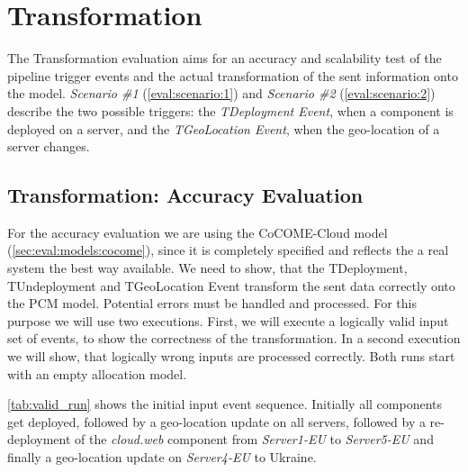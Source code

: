 \section{Transformation}
\label{sec:Evaluation:monitoring}

The Transformation evaluation aims for an accuracy and scalability test of the pipeline trigger events and the actual transformation of the sent information onto the model. \textit{Scenario \#1} (\autoref{eval:scenario:1}) and \textit{Scenario \#2} (\autoref{eval:scenario:2}) describe the two possible triggers: the \textit{TDeployment Event}, when a component is deployed on a server, and the \textit{TGeoLocation Event}, when the geo-location of a server changes. 

\subsection{Transformation: Accuracy Evaluation}

For the accuracy evaluation we are using the CoCOME-Cloud model (\autoref{sec:eval:models:cocome}), since it is completely specified and reflects the a real system the best way available. We need to show, that the TDeployment, TUndeployment and TGeoLocation Event transform the sent data correctly onto the PCM model. Potential errors must be handled and processed. For this purpose we will use two executions. First, we will execute a logically valid input set of events, to show the correctness of the transformation. In a second execution we will show, that logically wrong inputs are processed correctly. Both runs start with an empty allocation model.

\autoref{tab:valid_run} shows the initial input event sequence. Initially all components get deployed, followed by a geo-location update on all servers, followed by a re-deployment of the \textit{cloud.web} component from \textit{Server1-EU} to \textit{Server5-EU} and finally a geo-location update on \textit{Server4-EU} to Ukraine.

